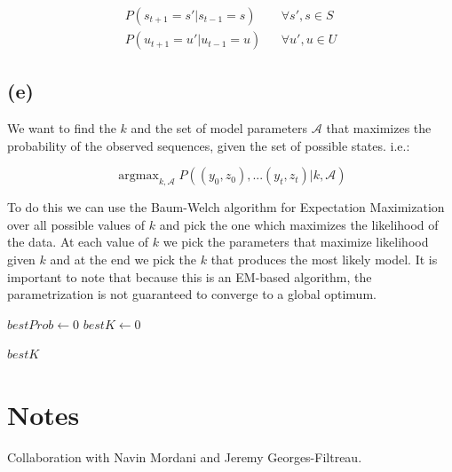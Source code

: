 \documentclass[11pt]{amsart}
\DeclareMathOperator*{\argmax}{argmax}
\begin{document}
\begin{equation}
\begin{aligned}
P(s_{t+1} = s' \vert s_{t-1} = s) && \forall s', s \in S\\
P(u_{t+1} = u' \vert u_{t-1} = u) && \forall u', u \in  U
\end{aligned}
\end{equation}

\subsection{(e)}

We want to find the $k$ and the set of model parameters $\mathcal{A}$  that maximizes the probability of the observed sequences, given the set of possible states. i.e.:

\begin{equation}
\argmax_{k, \mathcal{A}} P((y_0, z_0),...(y_t, z_t) \vert k, \mathcal{A})
\end{equation}

To do this we can use the Baum-Welch algorithm for Expectation Maximization over all possible values of $k$ and pick the one which maximizes the likelihood of the data. At each value of $k$ we pick the parameters that maximize likelihood given $k$ and at the end we pick the $k$ that produces the most likely model. It is important to note that because this is an EM-based algorithm, the parametrization is not guaranteed to converge to a global optimum.


\IncMargin{1em}
\begin{algorithm}[H]

	\Output{$\argmax_{k, \mathcal{A}} P((y_0, z_0),...(y_t, z_t) \vert k, \mathcal{A})$}
	
	$bestProb \leftarrow 0$
	$bestK \leftarrow 0$
	
	\Return $bestK$
\end{algorithm}

\section{Notes}
Collaboration with Navin Mordani and Jeremy Georges-Filtreau.



\end{document}
